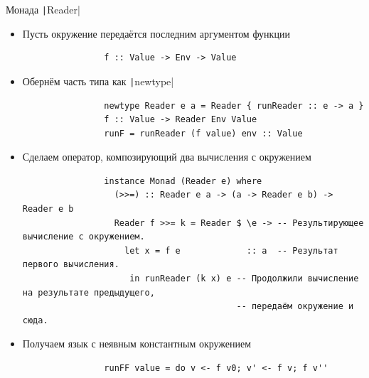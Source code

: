     \begin{frame}[fragile]{Монада \texttt|Reader|}
        \vspace{-0.5em}
        \pause
        \begin{itemize}
            \item Пусть окружение передаётся последним аргументом функции
            \begin{verbatim}
                f :: Value -> Env -> Value
            \end{verbatim}
            \item Обернём часть типа как \texttt|newtype|
            \begin{verbatim}
                newtype Reader e a = Reader { runReader :: e -> a }
                f :: Value -> Reader Env Value
                runF = runReader (f value) env :: Value
            \end{verbatim}
            \item Сделаем оператор, композирующий два вычисления с окружением
            \begin{verbatim}
                instance Monad (Reader e) where
                  (>>=) :: Reader e a -> (a -> Reader e b) -> Reader e b
                  Reader f >>= k = Reader $ \e -> -- Результирующее вычисление с окружением.
                    let x = f e             :: a  -- Результат первого вычисления.
                     in runReader (k x) e -- Продолжили вычисление на результате предыдущего,
                                          -- передаём окружение и сюда.
            \end{verbatim}
            \item Получаем язык с неявным константным окружением
            \begin{verbatim}
                runFF value = do v <- f v0; v' <- f v; f v''
            \end{verbatim}
        \end{itemize}
    \end{frame}


